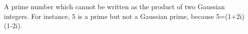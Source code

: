A prime number which cannot be written as the product of two 
Gaussian integers. For instance, 5 is a prime but not a 
Gaussian prime, because 5=(1+2i)(1-2i).